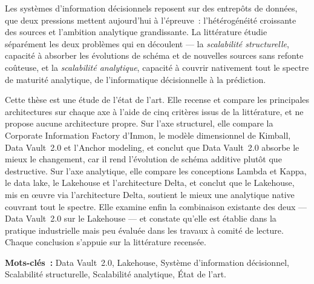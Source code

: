 
Les systèmes d'information décisionnels reposent sur des entrepôts de données, que deux
pressions mettent aujourd'hui à l'épreuve~: l'hétérogénéité croissante des sources et
l'ambition analytique grandissante. La littérature étudie séparément les deux problèmes qui
en découlent --- la \textit{scalabilité structurelle}, capacité à absorber les évolutions de
schéma et de nouvelles sources sans refonte coûteuse, et la \textit{scalabilité analytique},
capacité à couvrir nativement tout le spectre de maturité analytique, de l'informatique
décisionnelle à la prédiction.

Cette thèse est une étude de l'état de l'art. Elle recense et compare les principales
architectures sur chaque axe à l'aide de cinq critères issus de la littérature, et ne propose
aucune architecture propre. Sur l'axe structurel, elle compare la Corporate Information
Factory d'Inmon, le modèle dimensionnel de Kimball, Data Vault~2.0 et l'Anchor modeling, et
conclut que Data Vault~2.0 absorbe le mieux le changement, car il rend l'évolution de schéma
additive plutôt que destructive. Sur l'axe analytique, elle compare les conceptions Lambda et
Kappa, le data lake, le Lakehouse et l'architecture Delta, et conclut que le Lakehouse, mis en
œuvre via l'architecture Delta, soutient le mieux une analytique native couvrant tout le
spectre. Elle examine enfin la combinaison existante des deux --- Data Vault~2.0 sur le
Lakehouse --- et constate qu'elle est établie dans la pratique industrielle mais peu évaluée
dans les travaux à comité de lecture. Chaque conclusion s'appuie sur la littérature recensée.

\bigskip
\vspace{0.5cm}

\noindent\textbf{Mots-clés~:} Data Vault~2.0, Lakehouse, Système d'information
décisionnel, Scalabilité structurelle, Scalabilité analytique, État de l'art.
